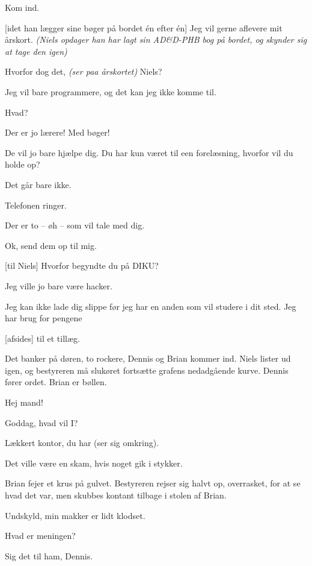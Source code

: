 \documentclass[a4paper,11pt]{article}
\begin{document}
\begin{sketch}

 Kom ind.

[idet han lægger sine bøger på bordet \'en efter \'en]
 Jeg vil gerne aflevere mit årskort. {\em (Niels opdager han har lagt
sin AD\&D-PHB bog på bordet, og skynder sig at tage den igen)}

 Hvorfor dog det, {\em (ser paa årskortet)} Niels?

 Jeg vil bare programmere, og det kan jeg ikke komme til.

 Hvad?

 Der er jo lærere! Med bøger!

 De vil jo bare hjælpe dig. Du har kun været til een
forelæsning, hvorfor vil du holde op?  

 Det går bare ikke.

\scene Telefonen ringer.

 Der er to -- øh -- som vil tale med dig.

 Ok, send dem op til mig.

[til Niels] Hvorfor begyndte du på DIKU?

 Jeg ville jo bare være hacker.

 Jeg kan ikke lade dig slippe før jeg har en anden som vil
studere i dit sted. Jeg har brug for pengene 

[afsides] til et tillæg.

\scene Det banker på døren, to rockere, Dennis og Brian kommer ind.
Niels lister ud igen, og bestyreren må slukøret fortsætte grafens
nedadgående kurve. 
Dennis fører ordet. Brian er bøllen.

 Hej mand!

 Goddag, hvad vil I?

 Lækkert kontor, du har (ser sig omkring).

 Det ville være en skam, hvis noget gik i stykker.

\scene Brian fejer et krus på gulvet. Bestyreren rejser sig halvt op,
overrasket, for at se hvad det var, men skubbes kontant tilbage i
stolen af Brian.

 Undskyld, min makker er lidt klodset.

 Hvad er meningen?

 Sig det til ham, Dennis.


\end{sketch}
\end{document}

